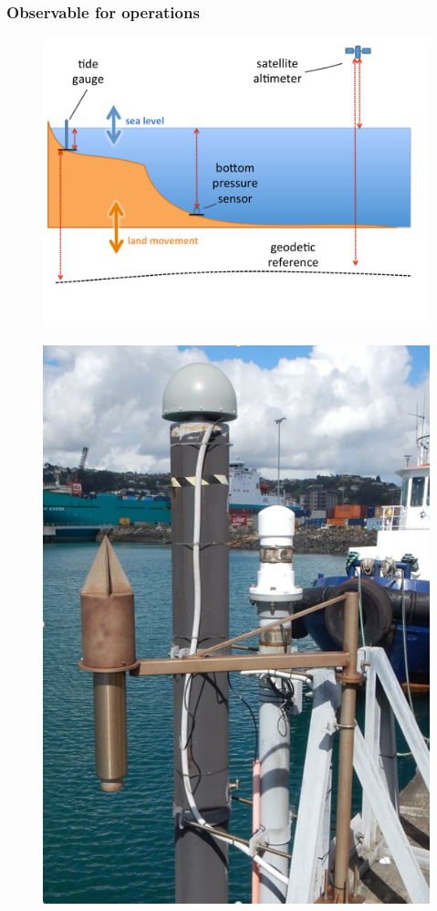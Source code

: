 \begin{frame}
\frametitle{Observable for operations}
\begin{minipage}{0.6\textwidth}
    \begin{figure}      
    \includegraphics[width=\textwidth]{figures/diagrams/sealevel_cartoon.pdf}
    \end{figure}
\end{minipage}
\hfill
\begin{minipage}{0.3\textwidth}
    \begin{figure}      
    \includegraphics[width=\textwidth]{figures/images/tidegaugeEg.png}

\end{figure}
\end{minipage}
\end{frame}

